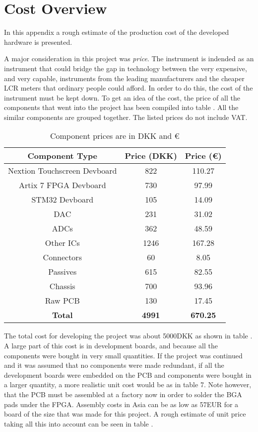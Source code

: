 \chapter{Cost Overview} \label{App:A_CostOverview}
In this appendix a rough estimate of the production cost of the developed hardware is presented.

A major consideration in this project was \textit{price}. The instrument is indended as an instrument that could bridge the gap in technology between the very expensive, and very capable, instruments from the leading manufacturers and the cheaper LCR meters that ordinary people could afford. In order to do this, the cost of the instrument must be kept down. To get an idea of the cost, the price of all the components that went into the project has been compiled into table . All the similar components are grouped together. The listed prices do not include VAT.

\begin{table}[H]
    \centering
    \renewcommand{\arraystretch}{1.5}
    \setlength{\tabcolsep}{8pt}
    \begin{tabular}{|c|c|c|}
    \hline
    \textbf{Component Type} & \textbf{Price (DKK)} & \textbf{Price (€)} \\ \hline
    Nextion Touchscreen Devboard & 822 & 110.27 \\ \hline
    Artix 7 FPGA Devboard & 730 & 97.99 \\ \hline
    STM32 Devboard & 105 & 14.09 \\ \hline
    DAC & 231 & 31.02 \\ \hline
    ADCs & 362 & 48.59 \\ \hline
    Other ICs & 1246 & 167.28 \\ \hline
    Connectors & 60 & 8.05 \\ \hline
    Passives & 615 & 82.55 \\ \hline
    Chassis & 700 & 93.96 \\ \hline
    Raw PCB & 130 & 17.45 \\ \hline
    \textbf{Total} & \textbf{4991} & \textbf{670.25} \\ \hline
    \end{tabular}
    \caption{Component prices are in DKK and €}
    \label{tab:ComponentTypeAndPrice}
\end{table}

The total cost for developing the project was about 5000DKK as shown in table . A large part of this cost is in development boards, and because all the components were bought in very small quantities. If the project was continued and it was assumed that no components were made redundant, if all the development boards were embedded on the PCB and components were bought in a larger quantity, a more realistic unit cost would be as in table 7. Note however, that the PCB must be assembled at a factory now in order to solder the BGA pads under the FPGA. Assembly costs in Asia can be as low as 57EUR for a board of the size that was made for this project. A rough estimate of unit price taking all this into account can be seen in table .

